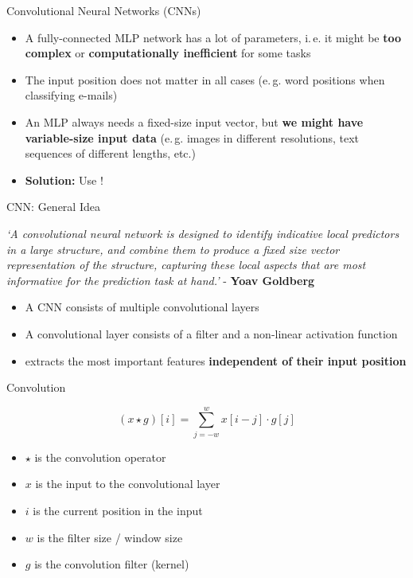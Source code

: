 \begin{frame}{Convolutional Neural Networks (CNNs)}{}
	\begin{itemize}
		\item A fully-connected MLP network has a lot of parameters, i.\,e. it might be \textbf{too complex} or \textbf{computationally inefficient} for some tasks
		\item The input position does not matter in all cases (e.\,g. word positions when classifying e-mails)
		\item An MLP always needs a fixed-size input vector, but \textbf{we might have variable-size input data}
			(e.\,g. images in different resolutions, text sequences of different lengths, etc.)
		\item \textbf{Solution:} Use !
	\end{itemize}
\end{frame}


\begin{frame}{CNN: General Idea}{}
	\begin{boxBlueNoFrame}
		\footnotesize
		\textit{`A convolutional neural network is designed to identify indicative local predictors in a large structure, and combine them to produce a fixed size vector
		representation of the structure, capturing these local aspects that are most informative for the prediction task at hand.'} - \textbf{Yoav Goldberg}
	\end{boxBlueNoFrame}
	\begin{itemize}
		\item A CNN consists of multiple convolutional layers
		\item A convolutional layer consists of a filter and a non-linear activation function
		\item {} extracts the most important features \textbf{independent of their input position}
	\end{itemize}
\end{frame}


\begin{frame}{Convolution}{}\important
	\begin{boxBlueNoFrame}
		\begin{equation*}
			(x \star g)[i] = \sum_{j=-w}^w x[i - j] \cdot g[j]
		\end{equation*}
	\end{boxBlueNoFrame}
		
	\begin{itemize}
		\item $\star$ is the convolution operator
		\item $x$ is the input to the convolutional layer
		\item $i$ is the current position in the input
		\item $w$ is the filter size / window size
		\item $g$ is the convolution filter (kernel)
	\end{itemize}
\end{frame}


